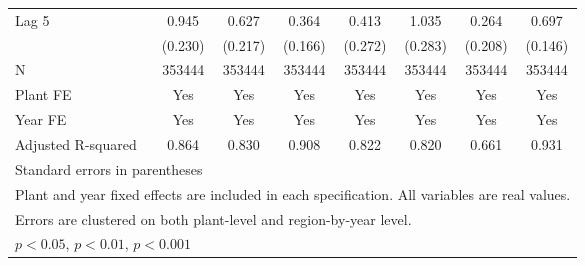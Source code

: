 \begin{table}[htbp]
\begin{tabular}{l*{7}{c}}
\addlinespace
Lag 5           &    0.945\sym{***}&    0.627\sym{**} &    0.364\sym{*}  &    0.413         &    1.035\sym{***}&    0.264         &    0.697\sym{***}\\
                &  (0.230)         &  (0.217)         &  (0.166)         &  (0.272)         &  (0.283)         &  (0.208)         &  (0.146)         \\
\midrule
N               &   353444         &   353444         &   353444         &   353444         &   353444         &   353444         &   353444         \\
Plant FE        &      Yes         &      Yes         &      Yes         &      Yes         &      Yes         &      Yes         &      Yes         \\
Year FE         &      Yes         &      Yes         &      Yes         &      Yes         &      Yes         &      Yes         &      Yes         \\
Adjusted R-squared&    0.864         &    0.830         &    0.908         &    0.822         &    0.820         &    0.661         &    0.931         \\
\bottomrule
\multicolumn{8}{l}{\footnotesize Standard errors in parentheses}\\
\multicolumn{8}{l}{\footnotesize Plant and year fixed effects are included in each specification. All variables are real values.}\\
\multicolumn{8}{l}{\footnotesize Errors are clustered on both plant-level and region-by-year level.}\\
\multicolumn{8}{l}{\footnotesize \sym{*} \(p<0.05\), \sym{**} \(p<0.01\), \sym{***} \(p<0.001\)}\\
\end{tabular}
\end{table}
